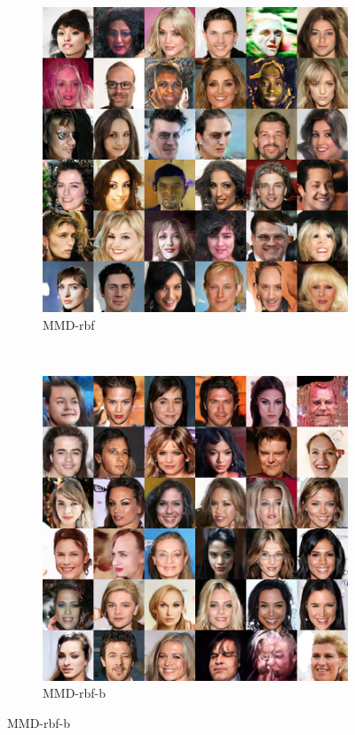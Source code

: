 \documentclass{article} %
\theoremstyle{plain}
\newtheorem*{proposition 1*}{Proposition 1}
\begin{document}
\begin{appendices}
\begin{figure}[tb]
	\begin{subfigure}[t]{0.45\linewidth}
		\centering
		\includegraphics[width=1\textwidth]{celebA_mmd_rbf.png}
		\caption{MMD-rbf\label{fig:sample_celebA_rbf}}
	\end{subfigure}
	~
	\begin{subfigure}[t]{0.45\textwidth}
		\centering
		\includegraphics[width=1\textwidth]{celebA_mgb.png}
		\caption{MMD-rbf-b\label{fig:sample_celebA_mgb}}
	\end{subfigure}
	

\end{figure}
\end{appendices}
\end{document}
